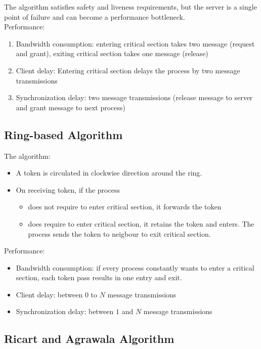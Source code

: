 \begin{multicols*}{2}
\noindent The algorithm satisfies safety and liveness requirements, but the server is a single point of failure and can become a performance bottleneck. \\

\noindent Performance:

\begin{enumerate}
  \item Bandwidth consumption: entering critical section takes two message (request and grant), exiting critical section takes one message (release)
  \item Client delay: Entering critical section delays the process by two message transmissions
  \item Synchronization delay: two message transmissions (release message to server and grant message to next process)
\end{enumerate}

\subsection{Ring-based Algorithm}

\noindent The algorithm:
\begin{itemize}
  \item A token is circulated in clockwise direction around the ring.
  \item On receiving token, if the process 
  \begin{itemize}
    \item does not require to enter critical section, it forwards the token
    \item does require to enter critical section, it retains the token and enters. The process sends the token to neigbour to exit critical section. 
  \end{itemize}
\end{itemize}

\noindent Performance:

\begin{itemize}
  \item Bandwidth consumption: if every process constantly wants to enter a critical section, each token pass results in one entry and exit.
  \item Client delay: between $0$ to $N$ message transmissions
  \item Synchronization delay: between $1$ and $N$ message transmissions
\end{itemize}

\subsection{Ricart and Agrawala Algorithm}


\end{multicols*}
